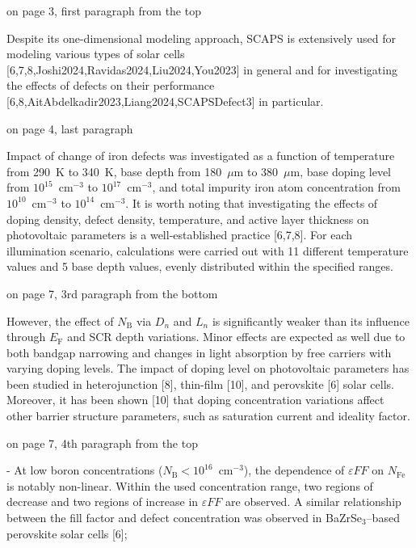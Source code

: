 \documentclass[a4paper,fleqn]{cas-sc}
\begin{document}
on page 3, first paragraph from the top


\begin{mdframed}
Despite its one-dimensional modeling approach, SCAPS is extensively used for modeling various types
of solar cells [\textcolor[rgb]{1.00,0.07,0.00}{6,7,8},Joshi2024,Ravidas2024,Liu2024,You2023] in general
and for investigating the effects of defects on their performance [\textcolor[rgb]{1.00,0.07,0.00}{6,8,}AitAbdelkadir2023,Liang2024,SCAPSDefect3] in particular.
\end{mdframed}


on page 4, last paragraph

\begin{mdframed}
Impact of change of iron defects was investigated as a function of temperature from 290~K to 340~K,
base depth from 180~$\mu$m to 380~$\mu$m,
base doping level from $10^{15}$~cm$^{-3}$ to $10^{17}$~cm$^{-3}$,
and total impurity iron atom concentration from $10^{10}$~cm$^{-3}$ to $10^{14}$~cm$^{-3}$.
\textcolor[rgb]{1.00,0.07,0.00}{It is worth noting that investigating the effects of doping density, defect density, temperature, and active layer thickness on photovoltaic parameters is a well-established practice [6,7,8].}
For each illumination scenario, calculations were carried out with 11 different temperature values and 5 base depth values,
evenly distributed within the specified ranges.
\end{mdframed}

on page 7, 3rd paragraph from the bottom

\begin{mdframed}
However, the effect of $N_\mathrm{B}$ via $D_n$ and $L_n$ is significantly weaker than its influence through $E_\mathrm{F}$ and SCR depth variations.
Minor effects are expected as well due to both bandgap narrowing and changes in light absorption by free carriers with varying doping levels.
\textcolor[rgb]{1.00,0.07,0.00}{The impact of doping level on photovoltaic parameters has been studied in heterojunction [8],
thin-film [10],
and perovskite [6] solar cells.}
Moreover, it has been shown [10] that
doping concentration variations affect other barrier structure parameters, such as saturation current and ideality factor.
\end{mdframed}

on page 7, 4th paragraph from the top

\begin{mdframed}
- At low boron concentrations ($N_\mathrm{B}<10^{16}$~cm$^{-3}$),
the dependence of $\varepsilon F\!F$ on $N_\mathrm{Fe}$ is notably non-linear.
Within the used concentration range, two regions of decrease and two regions of increase in $\varepsilon F\!F$ are observed.
\textcolor[rgb]{1.00,0.07,0.00}{A similar relationship between the fill factor and defect concentration was observed in BaZrSe$_3$--based perovskite solar cells [6]};
\end{mdframed}
\end{document}
